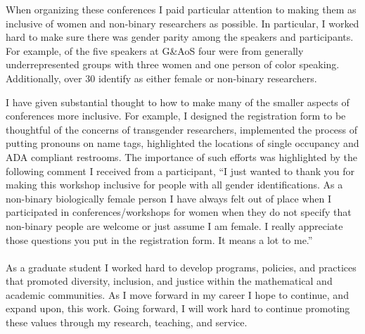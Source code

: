 \documentclass[11pt]{article}
\begin{document}
When organizing these conferences I paid particular attention to making them as inclusive of women and non-binary researchers as possible. In particular, I worked hard to make sure there was gender parity among the speakers and participants.  For example, of the five speakers at G\&AoS four were from generally underrepresented groups with three women and one person of color speaking. Additionally, over 30 identify as either female or non-binary researchers. 

I have given substantial thought to how to make many of the smaller aspects of conferences more inclusive. For example, I designed the registration form to be thoughtful of the concerns of transgender researchers, implemented the process of putting pronouns on name tags, highlighted the locations of single occupancy and ADA compliant restrooms. The importance of such efforts was highlighted by the following comment I received from a participant, ``I just wanted to thank you for making this workshop inclusive for people with all gender identifications. As a non-binary biologically female person I have always felt out of place when I participated in conferences/workshops for women when they do not specify that non-binary people are welcome or just assume I am female. I really appreciate those questions you put in the registration form. It means a lot to me.''
\\
\\
As a graduate student I worked hard to develop programs, policies, and practices that promoted diversity, inclusion, and justice within the mathematical and academic communities. As I move forward in my career I hope to continue, and expand upon, this work. Going forward, I will work hard to continue promoting these values through my research, teaching, and service. 



%
%
%
\end{document}
